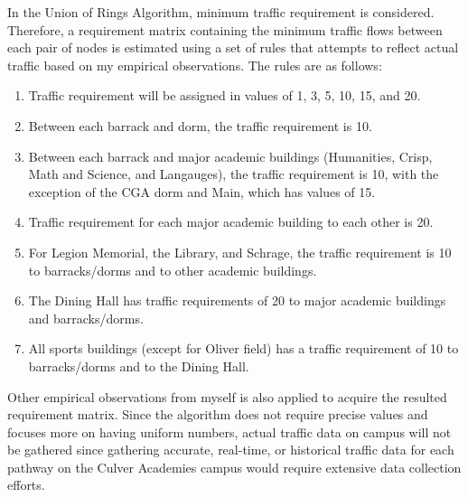 \documentclass[11pt]{article}
\begin{document}
In the Union of Rings Algorithm, minimum traffic requirement is considered. Therefore, a requirement matrix containing the minimum traffic flows between each pair of nodes is estimated using a set of rules that attempts to reflect actual traffic based on my empirical observations. The rules are as follows:
\begin{enumerate}
\item Traffic requirement will be assigned in values of 1, 3, 5, 10, 15, and 20. 
\item Between each barrack and dorm, the traffic requirement is 10. 
\item Between each barrack and major academic buildings (Humanities, Crisp, Math and Science, and Langauges), the traffic requirement is 10, with the exception of the CGA dorm and Main, which has values of 15. 
\item Traffic requirement for each major academic building to each other is 20.
\item For Legion Memorial, the Library, and Schrage, the traffic requirement is 10 to barracks/dorms and to other academic buildings.
\item The Dining Hall has traffic requirements of 20 to major academic buildings and barracks/dorms. 
\item All sports buildings (except for Oliver field) has a traffic requirement of 10 to barracks/dorms and to the Dining Hall.
\end{enumerate} \par
Other empirical observations from myself is also applied to acquire the resulted requirement matrix. Since the algorithm does not require precise values and focuses more on having uniform numbers, actual traffic data on campus will not be gathered since gathering accurate, real-time, or historical traffic data for each pathway on the Culver Academies campus would require extensive data collection efforts.
\end{document}
